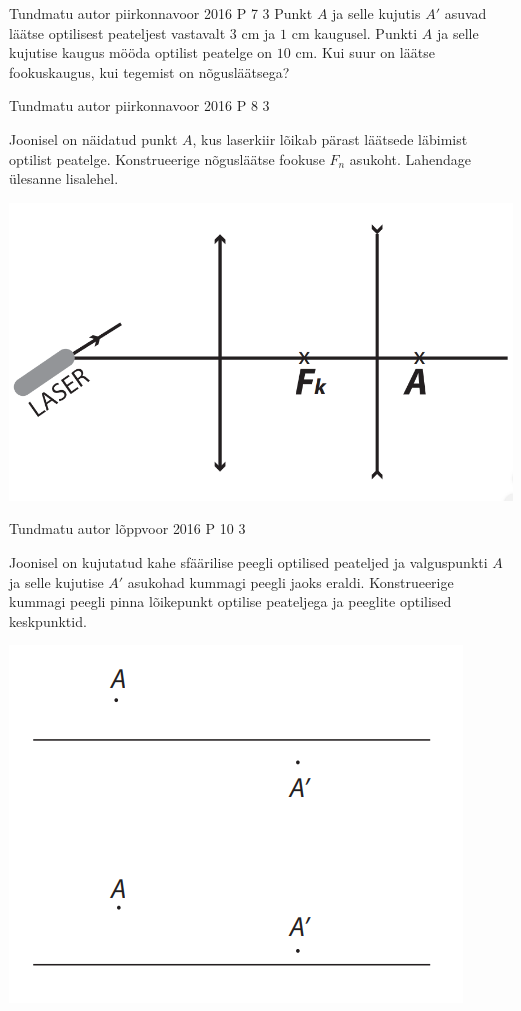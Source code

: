 \documentclass[11pt]{article}
\begin{document}
{%
{Tundmatu autor} %
{piirkonnavoor} %
{2016} %
{P 7} %
{3} %
{
\ifStatement
Punkt $A$ ja selle kujutis $A'$ asuvad läätse optilisest peateljest vastavalt $3$ cm ja $1$ cm kaugusel. Punkti $A$ ja selle kujutise kaugus mööda optilist peatelge on $10$ cm. Kui suur on läätse fookuskaugus, kui tegemist on nõgusläätsega?
\fi
}

{Tundmatu autor} %
{piirkonnavoor} %
{2016} %
{P 8} %
{3} %
{
\ifStatement
Joonisel on näidatud punkt $A$, kus laserkiir lõikab pärast läätsede läbimist optilist peatelge. Konstrueerige nõgusläätse fookuse $F_n$ asukoht. Lahendage ülesanne lisalehel.
\begin{center}
	\includegraphics[width=0.5\linewidth]{2016-v2p-08-yl.PNG}
\end{center}
\fi
}


{Tundmatu autor} %
{lõppvoor} %
{2016} %
{P 10} %
{3} %
{
\ifStatement
Joonisel on kujutatud kahe sfäärilise peegli optilised peateljed ja valguspunkti $A$ ja selle kujutise $A'$ asukohad kummagi peegli jaoks eraldi. Konstrueerige kummagi peegli pinna lõikepunkt optilise peateljega ja peeglite optilised keskpunktid.
\begin{center}
	\includegraphics[width=0.5\linewidth]{2016-v3p-10-yl.PNG}
\end{center}
\fi
}


}
\end{document}
